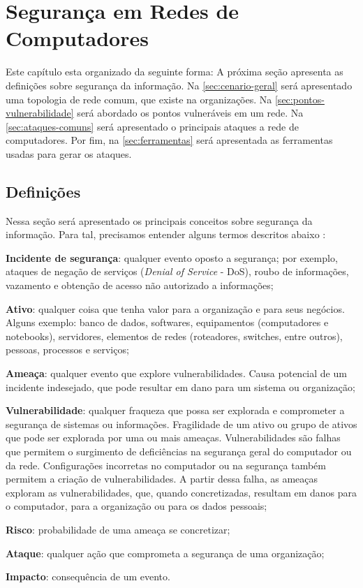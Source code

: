 \chapter{Segurança em Redes de Computadores} \label{ch:segurança}

Este capítulo esta organizado da seguinte forma: A próxima seção apresenta as definições sobre segurança da informação. Na \autoref{sec:cenario-geral} será apresentado uma topologia de rede comum, que existe na organizações. Na \autoref{sec:pontos-vulnerabilidade} será abordado os pontos vulneráveis em um rede. Na \autoref{sec:ataques-comuns} será apresentado o principais ataques a rede de computadores. Por fim, na \autoref{sec:ferramentas} será apresentada as ferramentas usadas para gerar os ataques.

\section{Definições} \label{sec:definições}

Nessa seção será apresentado os principais conceitos sobre segurança da informação. Para tal, precisamos entender alguns termos descritos abaixo \cite{esr-gestao}:

\begin{alineas}
\item \textbf{Incidente de segurança}: qualquer evento oposto a segurança; por exemplo, ataques de negação de serviços (\textit{Denial of Service} - DoS), roubo de informações, vazamento e obtenção de acesso não autorizado a informações;
 \item \textbf{Ativo}: qualquer coisa que tenha valor para a organização e para seus negócios. Alguns exemplo: banco de dados, softwares, equipamentos (computadores e notebooks), servidores, elementos de redes (roteadores, switches, entre outros), pessoas, processos e serviços;
 \item \textbf{Ameaça}: qualquer evento que explore vulnerabilidades. Causa potencial de um incidente indesejado, que pode resultar em dano para um sistema ou organização;
 \item \textbf{Vulnerabilidade}: qualquer fraqueza que possa ser explorada e comprometer a segurança de sistemas ou informações. Fragilidade de um ativo ou grupo de ativos que pode ser explorada por uma ou mais ameaças. Vulnerabilidades são falhas que permitem o surgimento de deficiências na segurança geral do computador ou da rede. Configurações incorretas no computador ou na segurança também permitem a criação de vulnerabilidades. A partir dessa falha, as ameaças exploram as vulnerabilidades, que, quando concretizadas, resultam em danos para o computador, para a organização ou para os dados pessoais;
 \item \textbf{Risco}: probabilidade de uma ameaça se concretizar;
 \item \textbf{Ataque}: qualquer ação que comprometa a segurança de uma organização;
 \item \textbf{Impacto}: consequência de um evento.
\end{alineas}

